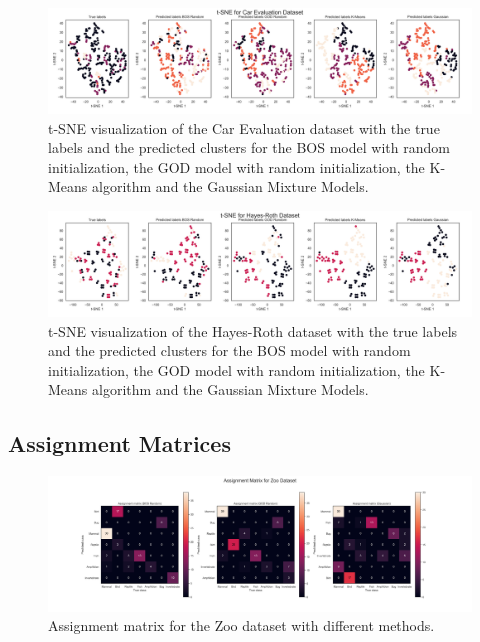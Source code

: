 \begin{figure}[H]
    \centering
    \includegraphics[width=\textwidth]{python_figures/tsne_car_evaluation.png}
    \caption{t-SNE visualization of the Car Evaluation dataset with the true labels and the predicted clusters for the BOS model with random initialization, the GOD model with random initialization, the K-Means algorithm and the Gaussian Mixture Models.}
    \label{fig:tsne_car}
\end{figure}

\begin{figure}[H]
    \centering
    \includegraphics[width=\textwidth]{python_figures/tsne_hayes-roth.png}
    \caption{t-SNE visualization of the Hayes-Roth dataset with the true labels and the predicted clusters for the BOS model with random initialization, the GOD model with random initialization, the K-Means algorithm and the Gaussian Mixture Models.}
    \label{fig:tsne_hr}
\end{figure}


\subsection*{Assignment Matrices}
\label{sec:appendix_assign}

\begin{figure}[H]
    \centering
    \includegraphics[width=\linewidth]{python_figures/assignment_matrix_zoo.png}
    \caption{Assignment matrix for the Zoo dataset with different methods.}
    \label{fig:assign_zoo}
\end{figure}

